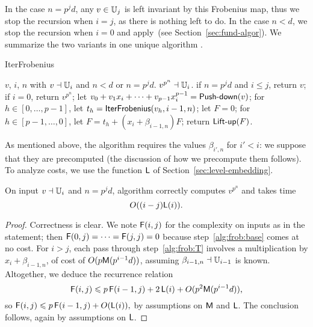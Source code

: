 In the case $n=p^jd$, any $v \in \mathbb{U}_j$ is left invariant by this
Frobenius map, thus we stop the recursion when $i=j$, as there is
nothing left to do. In the case $n<d$, we stop the recursion when
$i=0$ and apply~\todo (see Section~\ref{sec:fund-algor}). We summarize
the two variants in one unique algorithm .

\begin{algorithm}
  \caption{IterFrobenius} 
  \begin{algorithmic}[1]
    \REQUIRE $v$, $i$, $n$ with $v\dashv\mathbb{U}_i$ and $n<d$ or $n=p^jd$.
    \ENSURE $v^{p^n} \dashv \mathbb{U}_i$.
    \STATE \label{alg:frob:base} if $n=p^jd$ and $i \le j$, return $v$;
    \STATE \label{alg:frob:base2} if $i=0$, return $v^{p^n}$;
    \STATE \label{alg:frob:push} let $v_0 + v_1 x_i + \dots + v_{p-1} x_i^{p-1}=\text{{\sf Push-down}}(v)$;
    \STATE \label{alg:frob:rec} for $h \in [0,\dots,p-1]$, let $t_h = {\sf IterFrobenius}(v_h, i-1, n)$;
    \STATE let $F=0$;
    \STATE\label{alg:frob:T} for $h \in [p-1,\dots,0]$, let $F = t_h +  (x_i+\beta_{i-1,n})F$;
    \STATE \label{alg:frob:lift} return $\text{{\sf Lift-up}}(F)$.
  \end{algorithmic}
\end{algorithm}

As mentioned above, the algorithm requires the values $\beta_{i',n}$
for $i'<i$: we suppose that they are precomputed (the discussion of
how we precompute them follows).  To analyze costs, we use the
function $\mathsf{L}$ of Section~\ref{sec:level-embedding}.
\begin{theorem}
  \label{th:b-ifrob}
  On input $v\dashv\mathbb{U}_i$ and $n=p^jd$, algorithm 
  correctly computes $v^{p^n}$ and takes time
  \begin{equation}
    \label{eq:95}
    O((i-j)\mathsf{L}(i))
    \text{.}
  \end{equation}
\end{theorem}
\begin{proof}
  Correctness is clear. We note $\mathsf{F}(i,j)$ for the complexity on
  inputs as in the statement; then $\mathsf{F}(0,j)=\cdots=\mathsf{F}(j,j)=0$
  because step~\ref{alg:frob:base} comes at no cost. For $i>j$, each
  pass through step~\ref{alg:frob:T} involves a multiplication by
  $x_i+\beta_{i-1,n}$, of cost of $O(p\mathsf{M}(p^{i-1}d))$, assuming
  $\beta_{i-1,n}\dashv \mathbb{U}_{i-1}$ is known. Altogether, we deduce the
  recurrence relation
  \begin{equation}
    \label{eq:75}
    \mathsf{F}(i,j) \leqslant
    p\,\mathsf{F}(i-1,j)+2\,\mathsf{L}(i)+O(p^2\mathsf{M}(p^{i-1}d))
    \text{,}
  \end{equation}
  so $\mathsf{F}(i,j) \leqslant p\,\mathsf{F}(i-1,j)+O(\mathsf{L}(i)),$ by assumptions on
  $\mathsf{M}$ and $\mathsf{L}$.  The conclusion follows, again by assumptions
  on $\mathsf{L}$.
\end{proof}

